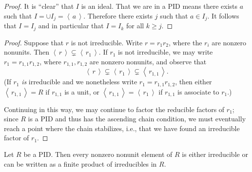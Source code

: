 \documentclass[english,course]{lecture}
\renewcommand{\geq}{\geqslant}
\newcommand{\ideal}[1]{\left\langle\, #1 \,\right\rangle}
\newenvironment{hint}{\startimportant}{}
\def\startimportant#1\end{[{Hint:} #1]\end}
\theoremstyle{plain}
\def\presnotes{}
\begin{document}

\begin{proof}
	It is ``clear'' that $I$ is an ideal. 
	That we are in a PID means there exists $a$ such that $I=\cup I_j=\ideal{a}$. Therefore there exists $j$ such that $a\in I_j$. It follows that $I=I_j$ and in particular that $I=I_k$ for all $k\geq j$.
\end{proof}

\presnotes

    

\begin{proof}
    Suppose that $r$ is not irreducible.
	Write $r = r_1 r_2$, where the $r_i$ are nonzero nonunits.
	Then $\ideal{r} \subsetneq \ideal{r_1}$.
	If $r_1$ is not irreducible, we may write $r_1 = r_{1,1}r_{1,2}$, where $r_{1,1},r_{1,2}$ are nonzero nonunits, and observe that
	\[
		\ideal{r} \subsetneq \ideal{r_1}\subsetneq \ideal{r_{1,1}}.
	\]
	(If $r_1$ \emph{is} irreducible and we nonetheless write $r_1 = r_{1,1} r_{1,2}$, then either $\ideal{r_{1,1}} = R$ if $r_{1,1}$ is a unit, or $\ideal{r_{1,1}} = \ideal{r_1}$ if $r_{1,1}$ is associate to $r_1$.)
	
	Continuing in this way, we may continue to factor the reducible factors of $r_1$; since $R$ is a PID and thus has the ascending chain condition, we must eventually reach a point where the chain stabilizes, i.e., that we have found an irreducible factor of $r_1$. 
\end{proof}

\presnotes 

\begin{theorem}
	Let $R$ be a PID.
	Then every nonzero nonunit element of $R$ is either irreducible or can be written as a finite product of irreducibles in $R$.
\end{theorem}
\end{document}
